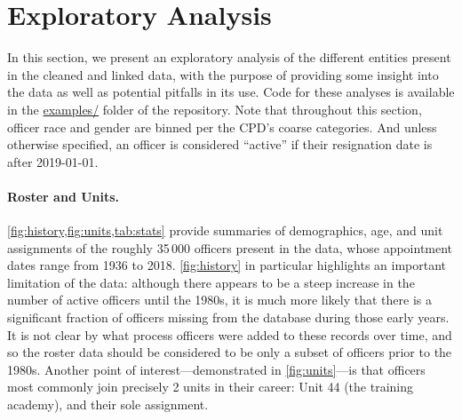 
\section{Exploratory Analysis} \label{sec:analysis}

In this section, we present an exploratory analysis of the
different entities present in the cleaned and linked data, with the purpose
of providing some insight into the data as well as potential pitfalls 
in its use. Code for these analyses is
available in the \url{examples/} folder of the repository. 
Note that throughout this section, officer race and gender are binned per the CPD's coarse categories.
And unless otherwise specified, an officer is considered ``active'' 
if their resignation date is after 2019-01-01. 

\paragraph{Roster and Units.} \cref{fig:history,fig:units,tab:stats} 
provide summaries of demographics, age, and unit assignments
of the roughly 35\,000 officers present in the data,
whose appointment dates range from 1936 to 2018.
\cref{fig:history} in particular highlights an important limitation of the data:
although there appears to be a steep increase in the number of active officers
until the 1980s, it is much more likely that there is a significant fraction of
officers missing from the database during those early years.
It is not clear by what process officers were added to these records over time,
and so the roster data should be considered to be only a subset of officers prior to 
the 1980s. Another point of interest---demonstrated in \cref{fig:units}---is that officers
most commonly join precisely 2 units in their career: Unit 44 (the training academy),
and their sole assignment.
 
